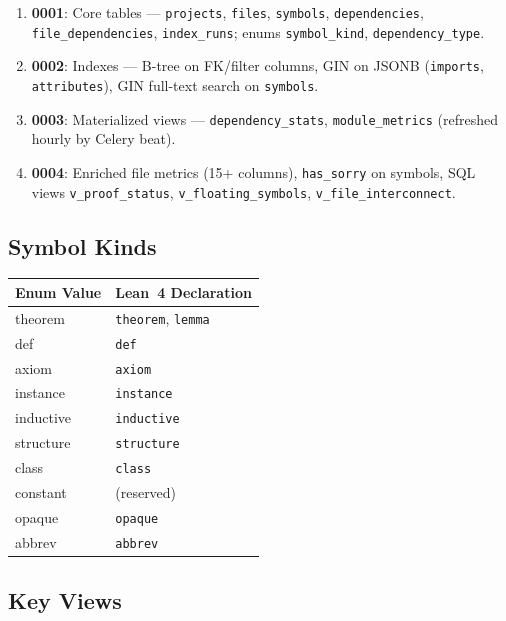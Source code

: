\documentclass[11pt,a4paper]{article}
\begin{document}
\begin{enumerate}
  \item \textbf{0001}: Core tables --- \texttt{projects}, \texttt{files},
        \texttt{symbols}, \texttt{dependencies}, \texttt{file\_dependencies},
        \texttt{index\_runs}; enums \texttt{symbol\_kind}, \texttt{dependency\_type}.
  \item \textbf{0002}: Indexes --- B-tree on FK/filter columns, GIN on JSONB
        (\texttt{imports}, \texttt{attributes}), GIN full-text search on
        \texttt{symbols}.
  \item \textbf{0003}: Materialized views --- \texttt{dependency\_stats},
        \texttt{module\_metrics} (refreshed hourly by Celery beat).
  \item \textbf{0004}: Enriched file metrics (15+ columns), \texttt{has\_sorry}
        on symbols, SQL views \texttt{v\_proof\_status},
        \texttt{v\_floating\_symbols}, \texttt{v\_file\_interconnect}.
\end{enumerate}

\subsection{Symbol Kinds}

\begin{tabular}{@{}ll@{}}
\toprule
\textbf{Enum Value} & \textbf{Lean~4 Declaration} \\
\midrule
theorem   & \texttt{theorem}, \texttt{lemma} \\
def       & \texttt{def} \\
axiom     & \texttt{axiom} \\
instance  & \texttt{instance} \\
inductive & \texttt{inductive} \\
structure & \texttt{structure} \\
class     & \texttt{class} \\
constant  & (reserved) \\
opaque    & \texttt{opaque} \\
abbrev    & \texttt{abbrev} \\
\bottomrule
\end{tabular}

\subsection{Key Views}
\end{document}
